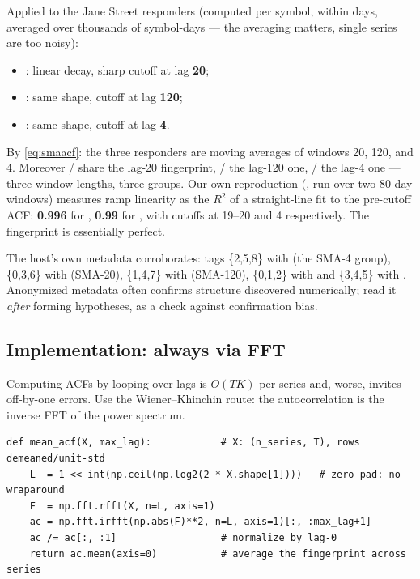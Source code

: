 Applied to the Jane Street responders (computed per symbol, within days,
averaged over thousands of symbol-days --- the averaging matters, single
series are too noisy):

\begin{itemize}
\item {}: linear decay, sharp cutoff at lag \textbf{20};
\item {}: same shape, cutoff at lag \textbf{120};
\item {}: same shape, cutoff at lag \textbf{4}.
\end{itemize}

By \eqref{eq:smaacf}: the three responders are moving averages of windows
20, 120, and 4. Moreover / share the lag-20 fingerprint,
/ the lag-120 one, / the lag-4 one --- three
window lengths, three groups. Our own reproduction
(, run over two 80-day windows) measures
ramp linearity as the $R^2$ of a straight-line fit to the pre-cutoff ACF:
\textbf{0.996} for , \textbf{0.99} for , with cutoffs at
19--20 and 4 respectively. The fingerprint is essentially perfect.

The host's own metadata corroborates:  tags
\{2,5,8\} with  (the SMA-4 group), \{0,3,6\} with 
(SMA-20), \{1,4,7\} with  (SMA-120), \{0,1,2\} with
 and \{3,4,5\} with . Anonymized metadata often
confirms structure discovered numerically; read it \emph{after} forming
hypotheses, as a check against confirmation bias.

\subsection{Implementation: always via FFT}

Computing ACFs by looping over lags is $O(TK)$ per series and, worse,
invites off-by-one errors. Use the Wiener--Khinchin route: the
autocorrelation is the inverse FFT of the power spectrum.

\begin{lstlisting}
def mean_acf(X, max_lag):            # X: (n_series, T), rows demeaned/unit-std
    L  = 1 << int(np.ceil(np.log2(2 * X.shape[1])))   # zero-pad: no wraparound
    F  = np.fft.rfft(X, n=L, axis=1)
    ac = np.fft.irfft(np.abs(F)**2, n=L, axis=1)[:, :max_lag+1]
    ac /= ac[:, :1]                  # normalize by lag-0
    return ac.mean(axis=0)           # average the fingerprint across series
\end{lstlisting}


